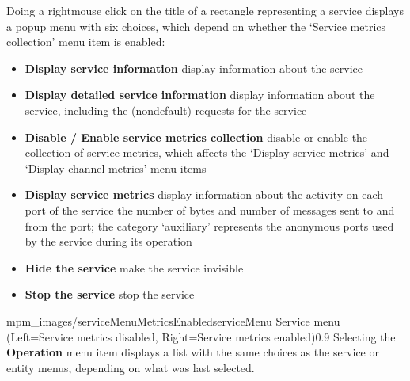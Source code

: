 \clearpage
Doing a right\longDash{}mouse click on the title of a rectangle representing a service
displays a popup menu with six choices, which depend on whether the `Service metrics
collection' menu item is enabled:
\begin{itemize}
\item\textbf{Display service information} display information about the service
\item\exSp\textbf{Display detailed service information} display information about the
service, including the (non\longDash{}default) requests for the service
\item\exSp\textbf{Disable / Enable service metrics collection} disable or enable the
collection of service metrics, which affects the `Display service metrics' and `Display
channel metrics' menu items
\item\exSp\textbf{Display service metrics} display information about the activity on each
port of the service \longDash{} the number of bytes and number of messages sent to and
from the port; the category `auxiliary' represents the anonymous ports used by the service
during its operation
\item\exSp\textbf{Hide the service} make the service invisible
\item\exSp\textbf{Stop the service} stop the service
\end{itemize}
%
{mpm_images/serviceMenuMetricsEnabled}{serviceMenu}%
{Service menu (Left=Service metrics disabled, Right=Service metrics enabled)}{0.9}
\clearpage
Selecting the \textbf{Operation} menu item displays a list with the same choices as the
service or entity menus, depending on what was last selected.\\

